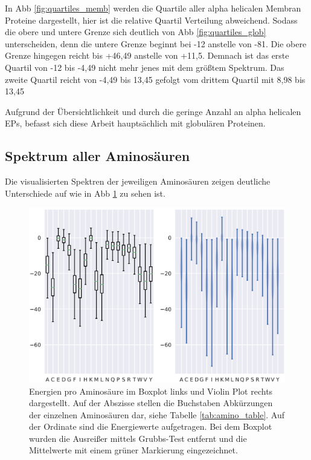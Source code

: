 In \ac{Abb} \ref{fig:quartiles_memb} werden die Quartile aller alpha helicalen Membran Proteine dargestellt, hier ist die relative Quartil Verteilung abweichend. Sodass die obere und untere Grenze sich deutlich von \ac{Abb} \ref{fig:quartiles_glob} unterscheiden, denn die untere Grenze beginnt bei -12 anstelle von -81. Die obere Grenze hingegen reicht bis +46,49 anstelle von +11,5. Demnach ist das erste Quartil von -12 bis -4,49 nicht mehr jenes mit dem größtem Spektrum. Das zweite Quartil reicht von -4,49 bis 13,45 gefolgt vom drittem Quartil mit 8,98 bis 13,45 

Aufgrund der Übersichtlichkeit und durch die geringe Anzahl an alpha helicalen \ac{EP}s, befasst sich diese Arbeit hauptsächlich mit globulären Proteinen. 


\subsection{Spektrum aller Aminosäuren}

Die visualisierten Spektren der jeweiligen Aminosäuren zeigen deutliche Unterschiede auf wie in \ac{Abb} \ref{fig:energy_ranges} zu sehen ist.

\begin{figure}
    \centering
    \includegraphics[width=.99\textwidth]{images/BoxPlot_energy_rages.png}
    \caption{Energien pro Aminosäure im Boxplot links und Violin Plot rechts dargestellt. Auf der Abszisse stellen die Buchstaben Abkürzungen der einzelnen Aminosäuren dar, siehe Tabelle \ref{tab:amino_table}. Auf der Ordinate sind die Energiewerte aufgetragen. Bei dem Boxplot wurden die Ausreißer mittels Grubbs-Test entfernt und die Mittelwerte mit einem grüner Markierung eingezeichnet.}
    \label{fig:energy_ranges}
\end{figure}

